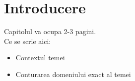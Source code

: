\chapter{Introducere}\label{ch:intro}
\pagestyle{fancy}

{\color{blue}\noindent Capitolul va ocupa 2-3 pagini.\\}
\noindent Ce se scrie aici:

\begin{itemize}
	\item Contextul temei
	\item Conturarea domeniului exact al temei
\end{itemize}

